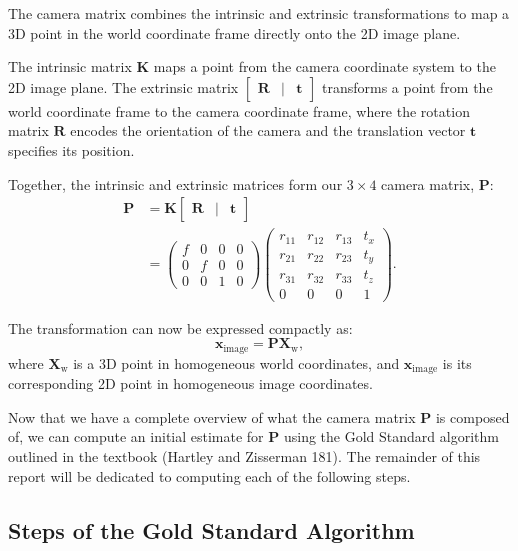 \documentclass[12pt]{article}
\begin{document}
The camera matrix combines the intrinsic and extrinsic transformations to map a 3D point in the world coordinate frame directly onto the 2D image plane.

The intrinsic matrix $\mathbf{K}$ maps a point from the camera coordinate system to the 2D image plane. The extrinsic matrix $\begin{bmatrix} \mathbf{R} & | & \mathbf{t} \end{bmatrix}$ transforms a point from the world coordinate frame to the camera coordinate frame, where the rotation matrix $\mathbf{R}$ encodes the orientation of the camera and the translation vector $\mathbf{t}$ specifies its position.

Together, the intrinsic and extrinsic matrices form our $3\times 4$ camera matrix, $\mathbf{P}$:
\begin{align*}
    \mathbf{P} &= \mathbf{K} \begin{bmatrix} \mathbf{R} & | & \mathbf{t} \end{bmatrix} \\
    &= \begin{pmatrix}
        f & 0 & 0 & 0 \\
        0 & f & 0 & 0 \\
        0 & 0 & 1 & 0
    \end{pmatrix}
    \begin{pmatrix}
        r_{11} & r_{12} & r_{13} & t_x \\
        r_{21} & r_{22} & r_{23} & t_y \\
        r_{31} & r_{32} & r_{33} & t_z \\
        0 & 0 & 0 & 1
    \end{pmatrix}.
\end{align*}

The transformation can now be expressed compactly as:
$$
\mathbf{x}_{\text{image}} = \mathbf{P} \mathbf{X}_{\text{w}},
$$
where $\mathbf{X}_{\text{w}}$ is a 3D point in homogeneous world coordinates, and $\mathbf{x}_{\text{image}}$ is its corresponding 2D point in homogeneous image coordinates.

Now that we have a complete overview of what the camera matrix $ \mathbf{P} $ is composed of, we can compute an initial estimate for $ \mathbf{P} $ using the Gold Standard algorithm outlined in the textbook (Hartley and Zisserman 181). The remainder of this report will be dedicated to computing each of the following steps.

\subsection{Steps of the Gold Standard Algorithm}
\end{document}

